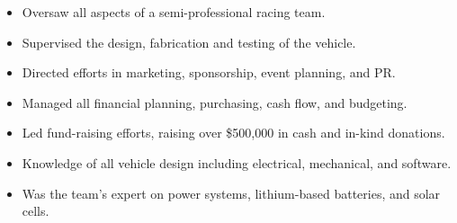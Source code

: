 \begin{entrylist}
{\begin{itemize}[leftmargin=12pt]
    \item Oversaw all aspects of a semi-professional racing team.
    \item Supervised the design, fabrication and testing of the vehicle.
    \item Directed efforts in marketing, sponsorship, event planning, and PR.
    \item Managed all financial planning, purchasing, cash flow, and budgeting.
    \item Led fund-raising efforts, raising over \$500,000 in cash and in-kind donations.
    \item Knowledge of all vehicle design including electrical, mechanical, and software.
    \item Was the team’s expert on power systems, lithium-based batteries, and solar cells.
  \end{itemize}
}
\end{entrylist}